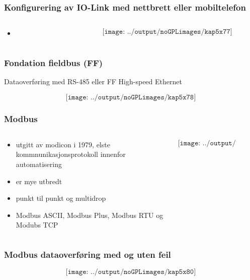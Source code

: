 \documentclass[aspectratio=169,xcolor=dvipsnames]{beamer}
\begin{document}
\begin{frame}
	\frametitle{Konfigurering av IO-Link med nettbrett eller mobiltelefon}
	\begin{columns}
		\begin{column}{0.5\textwidth}

			\begin{itemize}
				\item      
			\end{itemize}

			
		\end{column}

		\begin{column}{0.5\textwidth}
	$$\texttt{[image: ../output/noGPLimages/kap5x77]}$$
		\end{column}
	\end{columns}
\end{frame}
\begin{frame}
	\frametitle{Fondation fieldbus (FF)}

Dataoverføring med RS-485 eller FF High-speed Ethernet

			

	$$\texttt{[image: ../output/noGPLimages/kap5x78]}$$
\end{frame}
\begin{frame}
	\frametitle{Modbus}
	\begin{columns}
		\begin{column}{0.5\textwidth}

			\begin{itemize}
				\item utgitt av modicon i 1979, elste kommnunikasjonsprotokoll innenfor automatisering
				\item er mye utbredt
				\item punkt til punkt og multidrop
				\item Modbus ASCII, Modbus Plus, Modbus RTU og Modubs TCP
			\end{itemize}

			
		\end{column}

		\begin{column}{0.5\textwidth}
	$$\texttt{[image: ../output/noGPLimages/kap5x79]}$$
		\end{column}
	\end{columns}
\end{frame}
\begin{frame}
	\frametitle{Modbus dataoverføring med og uten feil}
	$$\texttt{[image: ../output/noGPLimages/kap5x80]}$$
\end{frame}
\end{document}
